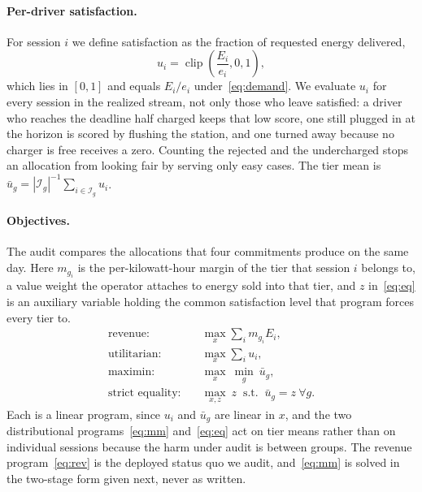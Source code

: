 \documentclass[manuscript, screen, review, anonymous]{acmart}
\begin{document}
\paragraph{Per-driver satisfaction.}
For session $i$ we define satisfaction as the fraction of requested energy delivered,
\begin{equation}
u_i=\operatorname{clip}\!\left(\frac{E_i}{e_i},0,1\right),\label{eq:sat}
\end{equation}
which lies in $[0,1]$ and equals $E_i/e_i$ under~\eqref{eq:demand}. We evaluate $u_i$ for every session in the realized stream, not only those who leave satisfied: a driver who reaches the deadline half charged keeps that low score, one still plugged in at the horizon is scored by flushing the station, and one turned away because no charger is free receives a zero. Counting the rejected and the undercharged stops an allocation from looking fair by serving only easy cases. The tier mean is $\bar u_g=|\mathcal{I}_g|^{-1}\sum_{i\in\mathcal{I}_g}u_i$.

\paragraph{Objectives.}
The audit compares the allocations that four commitments produce on the same day. Here $m_{g_i}$ is the per-kilowatt-hour margin of the tier that session $i$ belongs to, a value weight the operator attaches to energy sold into that tier, and $z$ in~\eqref{eq:eq} is an auxiliary variable holding the common satisfaction level that program forces every tier to.
\begin{align}
\text{revenue:}\quad & \textstyle\max_x \sum_i m_{g_i} E_i, \label{eq:rev}\\
\text{utilitarian:}\quad & \textstyle\max_x \sum_i u_i, \label{eq:util}\\
\text{maximin:}\quad & \textstyle\max_{x}\ \min_{g}\ \bar u_g, \label{eq:mm}\\
\text{strict equality:}\quad & \textstyle\max_{x,z}\ z \ \text{ s.t. }\ \bar u_g=z\ \forall g. \label{eq:eq}
\end{align}
Each is a linear program, since $u_i$ and $\bar u_g$ are linear in $x$, and the two distributional programs~\eqref{eq:mm} and~\eqref{eq:eq} act on tier means rather than on individual sessions because the harm under audit is between groups. The revenue program~\eqref{eq:rev} is the deployed status quo we audit, and~\eqref{eq:mm} is solved in the two-stage form given next, never as written.
\end{document}
